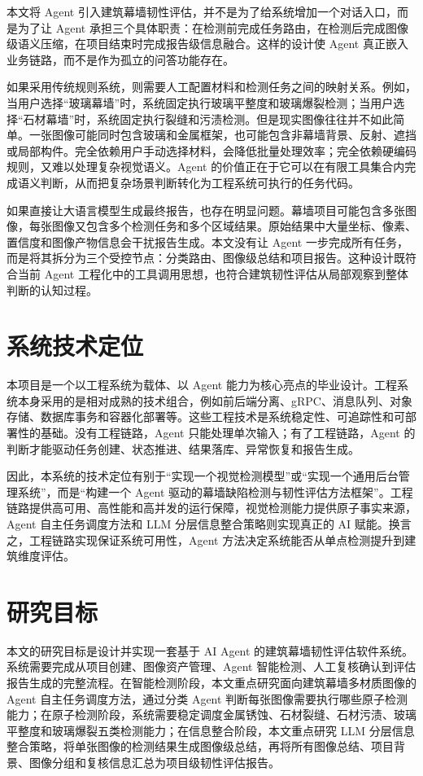 本文将 Agent 引入建筑幕墙韧性评估，并不是为了给系统增加一个对话入口，而是为了让 Agent 承担三个具体职责：在检测前完成任务路由，在检测后完成图像级语义压缩，在项目结束时完成报告级信息融合。这样的设计使 Agent 真正嵌入业务链路，而不是作为孤立的问答功能存在。

如果采用传统规则系统，则需要人工配置材料和检测任务之间的映射关系。例如，当用户选择“玻璃幕墙”时，系统固定执行玻璃平整度和玻璃爆裂检测；当用户选择“石材幕墙”时，系统固定执行裂缝和污渍检测。但是现实图像往往并不如此简单。一张图像可能同时包含玻璃和金属框架，也可能包含非幕墙背景、反射、遮挡或局部构件。完全依赖用户手动选择材料，会降低批量处理效率；完全依赖硬编码规则，又难以处理复杂视觉语义。Agent 的价值正在于它可以在有限工具集合内完成语义判断，从而把复杂场景判断转化为工程系统可执行的任务代码。

如果直接让大语言模型生成最终报告，也存在明显问题。幕墙项目可能包含多张图像，每张图像又包含多个检测任务和多个区域结果。原始结果中大量坐标、像素、置信度和图像产物信息会干扰报告生成。本文没有让 Agent 一步完成所有任务，而是将其拆分为三个受控节点：分类路由、图像级总结和项目报告。这种设计既符合当前 Agent 工程化中的工具调用思想，也符合建筑韧性评估从局部观察到整体判断的认知过程。

\section{系统技术定位}
\label{sec:introduction-system-technical-positioning}

本项目是一个以工程系统为载体、以 Agent 能力为核心亮点的毕业设计。工程系统本身采用的是相对成熟的技术组合，例如前后端分离、gRPC、消息队列、对象存储、数据库事务和容器化部署等。这些工程技术是系统稳定性、可追踪性和可部署性的基础。没有工程链路，Agent 只能处理单次输入；有了工程链路，Agent 的判断才能驱动任务创建、状态推进、结果落库、异常恢复和报告生成。

因此，本系统的技术定位有别于“实现一个视觉检测模型”或“实现一个通用后台管理系统”，而是“构建一个 Agent 驱动的幕墙缺陷检测与韧性评估方法框架”。工程链路提供高可用、高性能和高并发的运行保障，视觉检测能力提供原子事实来源，Agent 自主任务调度方法和 LLM 分层信息整合策略则实现真正的 AI 赋能。换言之，工程链路实现保证系统可用性，Agent 方法决定系统能否从单点检测提升到建筑维度评估。

\section{研究目标}
\label{sec:introduction-research-goal}

本文的研究目标是设计并实现一套基于 AI Agent 的建筑幕墙韧性评估软件系统。系统需要完成从项目创建、图像资产管理、Agent 智能检测、人工复核确认到评估报告生成的完整流程。在智能检测阶段，本文重点研究面向建筑幕墙多材质图像的 Agent 自主任务调度方法，通过分类 Agent 判断每张图像需要执行哪些原子检测能力；在原子检测阶段，系统需要稳定调度金属锈蚀、石材裂缝、石材污渍、玻璃平整度和玻璃爆裂五类检测能力；在信息整合阶段，本文重点研究 LLM 分层信息整合策略，将单张图像的检测结果生成图像级总结，再将所有图像总结、项目背景、图像分组和复核信息汇总为项目级韧性评估报告。

